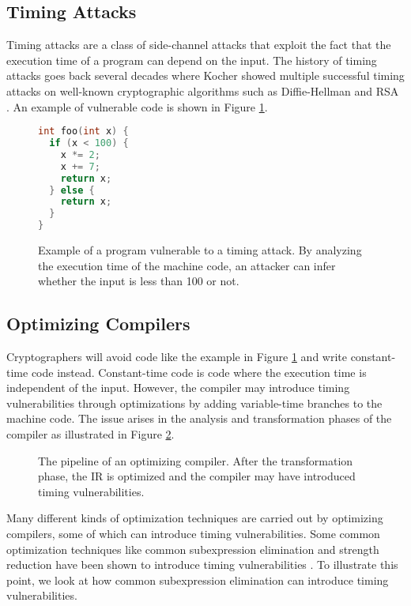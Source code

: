 \subsection{Timing Attacks}
Timing attacks are a class of side-channel attacks that exploit the fact that the execution time of a program can depend on the input.
The history of timing attacks goes back several decades where Kocher showed multiple successful timing attacks on well-known cryptographic algorithms such as Diffie-Hellman and RSA \citep{1996-timing-attacks}.
An example of vulnerable code is shown in Figure \ref{fig:timing-attack-example}.
\begin{figure}[H]
  \begin{lstlisting}[style=defstyle,language=C, xleftmargin=6.8cm, xrightmargin=6.8cm]
int foo(int x) {
  if (x < 100) {
    x *= 2;
    x += 7;
    return x;
  } else {
    return x;
  }
} \end{lstlisting} 
  \caption{Example of a program vulnerable to a timing attack. By analyzing the execution time of the machine code, an attacker can infer whether the input is less than 100 or not.}
  \label{fig:timing-attack-example}
\end{figure}

\subsection{Optimizing Compilers}
Cryptographers will avoid code like the example in Figure \ref{fig:timing-attack-example} and write constant-time code instead.
Constant-time code is code where the execution time is independent of the input.
However, the compiler may introduce timing vulnerabilities through optimizations by adding variable-time branches to the machine code.
The issue arises in the analysis and transformation phases of the compiler as illustrated in Figure \ref{fig:optimizing-compiler-pipeline}.

\begin{figure}[H]
  \centering
  
  \caption{The pipeline of an optimizing compiler. After the transformation phase, the IR is optimized and the compiler may have introduced timing vulnerabilities.}
  \label{fig:optimizing-compiler-pipeline}
\end{figure}

Many different kinds of optimization techniques are carried out by optimizing compilers, some of which can introduce timing vulnerabilities.
Some common optimization techniques like common subexpression elimination and strength reduction have been shown to introduce timing vulnerabilities \citep{optimizations-linked-to-timing-attacks}.
To illustrate this point, we look at how common subexpression elimination can introduce timing vulnerabilities.


